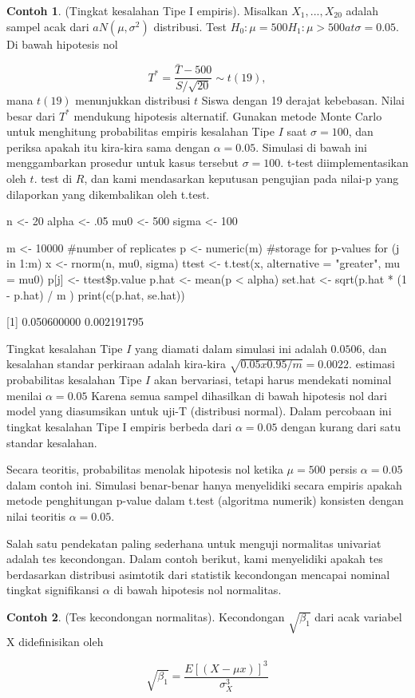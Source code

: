 \documentclass[a4paper,12pt]{article}
\theoremstyle{definition}
\newtheorem{example}{Contoh}[section]
\begin{document}
\begin{example}
    (Tingkat kesalahan Tipe I empiris). Misalkan $X_{1},...,X_{20}$ adalah sampel acak dari $a N \left ( \mu , \sigma ^{2} \right )$ distribusi. Test $H_{0}: \mu = 500 H_{1} : \mu > 500 at \sigma = 0.05$. Di bawah hipotesis nol
\end{example}
\begin{equation*}
    T^{*} = \frac{\bar{T}- 500}{S/\sqrt{20}} \sim t(19),
\end{equation*}
mana $t(19)$ menunjukkan distribusi $t$ Siswa dengan 19 derajat kebebasan.
Nilai besar dari $T^{*}$ mendukung hipotesis alternatif. Gunakan metode Monte Carlo untuk menghitung probabilitas empiris kesalahan Tipe $I$ saat $\sigma = 100$, dan periksa apakah itu kira-kira sama dengan $\alpha = 0.05$.
Simulasi di bawah ini menggambarkan prosedur untuk kasus tersebut $\sigma = 100.$ t-test diimplementasikan oleh $t$. test di $R$, dan kami mendasarkan keputusan pengujian pada nilai-p yang dilaporkan yang dikembalikan oleh t.test.
\begin{spverbatim}
    n <- 20
    alpha <- .05
    mu0 <- 500
    sigma <- 100

    m <- 10000         #number of replicates
    p <- numeric(m)    #storage  for p-values
    for (j in 1:m) {
         x <- rnorm(n, mu0, sigma)
         ttest <- t.test(x, alternative = "greater", mu = mu0)
         p[j] <- ttest\$p.value
    }
    p.hat <- mean(p < alpha)
    set.hat <- sqrt(p.hat * (1 - p.hat) / m )
    print(c(p.hat, se.hat))

    [1] 0.050600000 0.002191795
\end{spverbatim}
 Tingkat kesalahan Tipe $I$ yang diamati dalam simulasi ini adalah $0.0506$, dan kesalahan standar perkiraan adalah kira-kira $\sqrt{0.05 x 0.95/m} = 0.0022.$ estimasi probabilitas kesalahan Tipe $I$ akan bervariasi, tetapi harus mendekati nominal menilai $\alpha = 0.05$ Karena semua sampel dihasilkan di bawah hipotesis nol dari model yang diasumsikan untuk uji-T (distribusi normal). Dalam percobaan ini tingkat kesalahan Tipe I empiris berbeda dari $\alpha = 0.05$ dengan kurang dari satu standar kesalahan.
 
Secara teoritis, probabilitas menolak hipotesis nol ketika $\mu = 500$ persis $\alpha = 0.05$ dalam contoh ini. Simulasi benar-benar hanya menyelidiki secara empiris apakah metode penghitungan p-value dalam t.test (algoritma numerik) konsisten dengan nilai teoritis  $\alpha = 0.05$.

Salah satu pendekatan paling sederhana untuk menguji normalitas univariat adalah tes kecondongan. Dalam contoh berikut, kami menyelidiki apakah tes berdasarkan distribusi asimtotik dari statistik kecondongan mencapai nominal tingkat signifikansi $\alpha$ di bawah hipotesis nol normalitas.
\begin{example}
    (Tes kecondongan normalitas). Kecondongan $\sqrt{\beta _{1}}$ dari acak variabel X didefinisikan oleh 
    
\end{example}
\begin{equation}
    \sqrt{\beta _{1}} = \frac{E\left [ (X - \mu x) \right ]^{3}}{\sigma ^{3}_{X}}
\end{equation}
\end{document}

